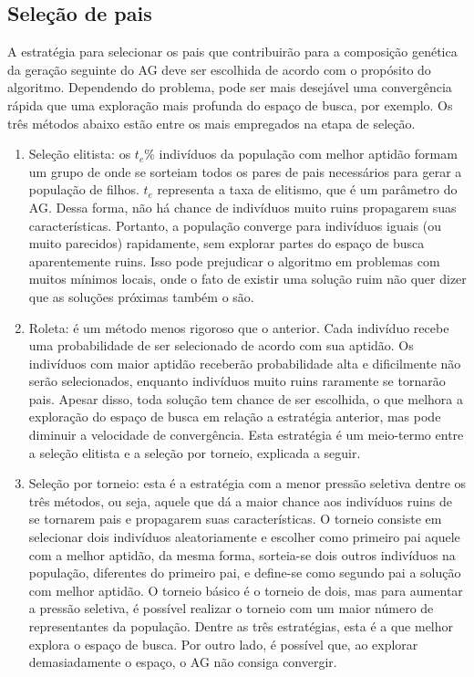 \subsection{Seleção de pais}
A estratégia para selecionar os pais que contribuirão para a composição genética da geração seguinte do AG deve ser escolhida de acordo com o propósito do algoritmo. Dependendo do problema, pode ser mais desejável uma convergência rápida que uma exploração mais profunda do espaço de busca, por exemplo. Os três métodos abaixo estão entre os mais empregados na etapa de seleção.

\begin{enumerate}
	\item Seleção elitista: os $t_e\%$ indivíduos da população com melhor aptidão formam um grupo de onde se sorteiam todos os pares de pais necessários para gerar a população de filhos. $t_e$ representa a taxa de elitismo, que é um parâmetro do AG. Dessa forma, não há chance de indivíduos muito ruins propagarem suas características. Portanto, a população converge para indivíduos iguais (ou muito parecidos) rapidamente, sem explorar partes do espaço de busca aparentemente ruins. Isso pode prejudicar o algoritmo em problemas com muitos mínimos locais, onde o fato de existir uma solução ruim não quer dizer que as soluções próximas também o são.
	\item Roleta: é um método menos rigoroso que o anterior. Cada indivíduo recebe uma probabilidade de ser selecionado de acordo com sua aptidão. Os indivíduos com maior aptidão receberão probabilidade alta e dificilmente não serão selecionados, enquanto indivíduos muito ruins raramente se tornarão pais. Apesar disso, toda solução tem chance de ser escolhida, o que melhora a exploração do espaço de busca em relação a estratégia anterior, mas pode diminuir a velocidade de convergência. Esta estratégia é um meio-termo entre a seleção elitista e a seleção por torneio, explicada a seguir.
	\item Seleção por torneio: esta é a estratégia com a menor pressão seletiva dentre os três métodos, ou seja, aquele que dá a maior chance aos indivíduos ruins de se tornarem pais e propagarem suas características. O torneio consiste em selecionar dois indivíduos aleatoriamente e escolher como primeiro pai aquele com a melhor aptidão, da mesma forma, sorteia-se dois outros indivíduos na população, diferentes do primeiro pai, e define-se como segundo pai a solução com melhor aptidão. O torneio básico é o torneio de dois, mas para aumentar a pressão seletiva, é possível realizar o torneio com um maior número de representantes da população. Dentre as três estratégias, esta é a que melhor explora o espaço de busca. Por outro lado, é possível que, ao explorar demasiadamente o espaço, o AG não consiga convergir.
\end{enumerate}

